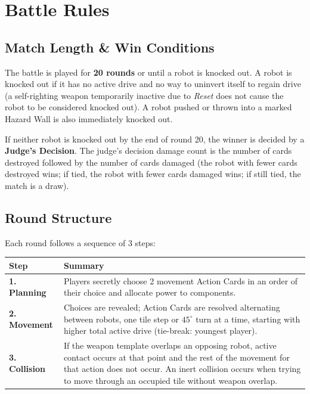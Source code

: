 \documentclass[11pt,a4paper]{article}
\newcommand{\inlineIcon}[1]{\raisebox{-0.22ex}{\resizebox{!}{1.15em}{#1}}}
\begin{document}
\clearpage


\section{Battle Rules}

\subsection{Match Length \& Win Conditions}

The battle is played for \textbf{20 rounds} or until a robot is knocked out. A robot is knocked out if it has no active drive \inlineIcon{\resourceM} and no way to uninvert itself to regain drive \inlineIcon{\resourceM} (a self-righting weapon temporarily inactive due to \textit{Reset} does not cause the robot to be considered knocked out). A robot pushed or thrown into a marked Hazard Wall is also immediately knocked out.

If neither robot is knocked out by the end of round 20, the winner is decided by a \textbf{Judge's Decision}. The judge's decision damage count is the number of cards destroyed followed by the number of cards damaged (the robot with fewer cards destroyed wins; if tied, the robot with fewer cards damaged wins; if still tied, the match is a draw).

\subsection{Round Structure}

Each round follows a sequence of 3 steps:

\noindent
{\small\begin{tabularx}{\textwidth}{l p{12.5cm}}
  \toprule
  \textbf{Step} & \textbf{Summary} \\
  \midrule
  \textbf{1. Planning} & Players secretly choose 2 movement Action Cards in an order of their choice and allocate power to components. \\
  \textbf{2. Movement} & Choices are revealed; Action Cards are resolved alternating between robots, one tile step or $45^\circ$ turn at a time, starting with higher total active drive (tie-break: youngest player). \\
  \textbf{3. Collision} & If the weapon template overlaps an opposing robot, active contact occurs at that point and the rest of the movement for that action does not occur. An inert collision occurs when trying to move through an occupied tile without weapon overlap. \\
  \bottomrule
\end{tabularx}}
\end{document}
